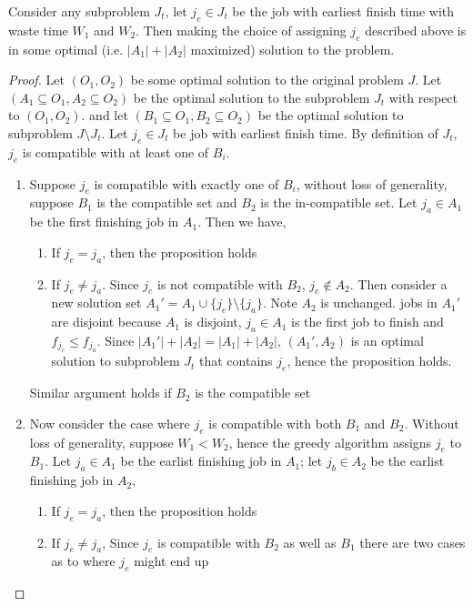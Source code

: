 \documentclass[11pt]{article}
\begin{document}
\begin{enumerate}
  \begin{proposition*}
    Consider any subproblem $J_t$, let $j_e\in J_t$ be the job with earliest finish time with waste time $W_1$ and $W_2$. Then making the choice of assigning $j_e$ described above is in some optimal (i.e. $|A_1| + |A_2|$ maximized) solution to the problem.
  \end{proposition*}

  \begin{proof}
    Let $(O_1, O_2)$ be some optimal solution to the original problem $J$. Let $(A_1 \subseteq O_1, A_2\subseteq O_2)$ be the optimal solution to the subproblem $J_t$ with respect to $(O_1, O_2)$. and let $(B_1 \subseteq O_1, B_2\subseteq O_2)$ be the optimal solution to subproblem $J\setminus J_t$. Let $j_e\in J_t$ be job with earliest finish time. By definition of $J_t$, $j_e$ is compatible with at least one of $B_i$.
    \begin{enumerate}
      \item Suppose $j_e$ is compatible with exactly one of $B_i$, without loss of generality, suppose $B_1$ is the compatible set and $B_2$ is the in-compatible set. Let $j_a \in A_1$ be the first finishing job in $A_1$. Then we have,
      \begin{enumerate}
        \item If $j_e = j_a$, then the proposition holds
        \item If $j_e \neq j_a$. Since $j_e$ is not compatible with $B_2$, $j_e\not\in A_2$. Then consider a new solution set $A_1' = A_1 \cup \{ j_e \} \setminus \{ j_a\}$. Note $A_2$ is unchanged. jobs in $A_1'$ are disjoint because $A_1$ is disjoint, $j_a\in A_1$ is the first job to finish and $f_{j_e} \leq f_{j_a}$. Since $|A_1'| + |A_2| = |A_1| + |A_2|$, $(A_1', A_2)$ is an optimal solution to subproblem $J_t$ that contains $j_e$, hence the proposition holds.
      \end{enumerate}
      Similar argument holds if $B_2$ is the compatible set
      \item Now consider the case where $j_e$ is compatible with both $B_1$ and $B_2$. Without loss of generality, suppose $W_1 < W_2$, hence the greedy algorithm assigns $j_e$ to $B_1$. Let $j_a\in A_1$ be the earlist finishing job in $A_1$; let $j_b\in A_2$ be the earlist finishing job in $A_2$,
      \begin{enumerate}
        \item If $j_e = j_a$, then the proposition holds
        \item If $j_e \neq j_a$, Since $j_e$ is compatible with $B_2$ as well as $B_1$ there are two cases as to where $j_e$ might end up

\end{enumerate}
\end{enumerate}
\end{proof}
\end{enumerate}
\end{document}
